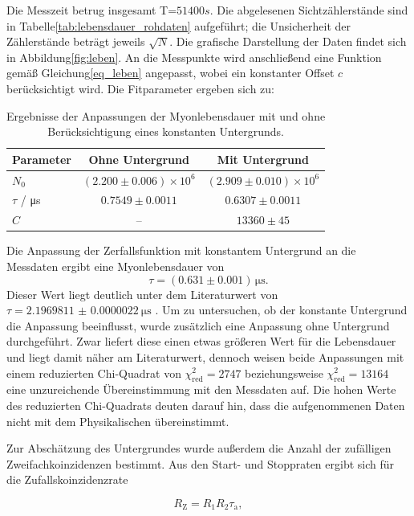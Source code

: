 Die Messzeit betrug insgesamt T=$51400s$. Die abgelesenen Sichtzählerstände sind in Tabelle\ref{tab:lebensdauer_rohdaten} aufgeführt; die Unsicherheit der Zählerstände beträgt jeweils $\sqrt{N}$. Die grafische
Darstellung der Daten findet sich in Abbildung\ref{fig:leben}.
An die Messpunkte wird anschließend eine Funktion gemäß Gleichung\ref{eq_leben} angepasst, wobei ein konstanter Offset $c$ berücksichtigt wird. Die Fitparameter ergeben sich zu:
\begin{table}[H]
    \centering
    \caption{Ergebnisse der Anpassungen der Myonlebensdauer mit und ohne Berücksichtigung eines konstanten Untergrunds.}
    \label{tab:myon_fit}
    \begin{tabular}{lcc}
        \toprule
        Parameter & Ohne Untergrund & Mit Untergrund \\
        \midrule
        $N_0$ & $(2.200 \pm 0.006)\times 10^6$ & $(2.909 \pm 0.010)\times 10^6$ \\
        $\tau$ / \si{\micro\second} & $0.7549 \pm 0.0011$ & $0.6307 \pm 0.0011$ \\
        $C$ & -- & $13360 \pm 45$ \\
        \bottomrule
    \end{tabular}
\end{table}

Die Anpassung der Zerfallsfunktion mit konstantem Untergrund an die Messdaten ergibt eine Myonlebensdauer von
\[
\tau = (\num{0.631} \pm \num{0.001})\,\si{\micro\second}.
\]
Dieser Wert liegt deutlich unter dem Literaturwert von \(\tau = \SI{2.1969811(22)}{\micro\second}\) \cite{nist_xray}. Um zu untersuchen, ob der konstante Untergrund die Anpassung beeinflusst, wurde zusätzlich eine Anpassung ohne Untergrund durchgeführt. Zwar liefert diese einen etwas größeren Wert für die Lebensdauer und liegt damit näher am Literaturwert, dennoch weisen beide Anpassungen mit einem reduzierten Chi-Quadrat von \(\chi^2_\mathrm{red}=2747\) beziehungsweise \(\chi^2_\mathrm{red}=13164\) eine unzureichende Übereinstimmung mit den Messdaten auf. Die hohen Werte des reduzierten Chi-Quadrats deuten darauf hin, dass die aufgenommenen Daten nicht mit dem Physikalischen übereinstimmt.

Zur Abschätzung des Untergrundes wurde außerdem die Anzahl der zufälligen Zweifachkoinzidenzen bestimmt. Aus den Start- und Stoppraten ergibt sich für die Zufallskoinzidenzrate

\begin{equation}
R_\mathrm{Z}=R_1R_2\tau_\mathrm{a},
\end{equation}

